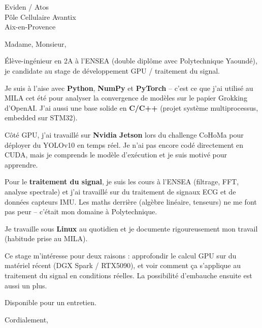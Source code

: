 \documentclass[11pt,a4paper]{letter}
\begin{document}
\begin{letter}{Eviden / Atos\\
Pôle Cellulaire Avantix\\
Aix-en-Provence}

\opening{Madame, Monsieur,}

Élève-ingénieur en 2A à l'ENSEA (double diplôme avec Polytechnique Yaoundé), je candidate au stage de développement GPU / traitement du signal.

Je suis à l'aise avec \textbf{Python}, \textbf{NumPy} et \textbf{PyTorch} -- c'est ce que j'ai utilisé au MILA cet été pour analyser la convergence de modèles sur le papier Grokking d'OpenAI. J'ai aussi une base solide en \textbf{C/C++} (projet système multiprocessus, embedded sur STM32).

Côté GPU, j'ai travaillé sur \textbf{Nvidia Jetson} lors du challenge CoHoMa pour déployer du YOLOv10 en temps réel. Je n'ai pas encore codé directement en CUDA, mais je comprends le modèle d'exécution et je suis motivé pour apprendre.

Pour le \textbf{traitement du signal}, je suis les cours à l'ENSEA (filtrage, FFT, analyse spectrale) et j'ai travaillé sur du traitement de signaux ECG et de données capteurs IMU. Les maths derrière (algèbre linéaire, tenseurs) ne me font pas peur -- c'était mon domaine à Polytechnique.

Je travaille sous \textbf{Linux} au quotidien et je documente rigoureusement mon travail (habitude prise au MILA).

Ce stage m'intéresse pour deux raisons : approfondir le calcul GPU sur du matériel récent (DGX Spark / RTX5090), et voir comment ça s'applique au traitement du signal en conditions réelles. La possibilité d'embauche ensuite est aussi un plus.

Disponible pour un entretien.

\closing{Cordialement,}

\end{letter}
\end{document}
